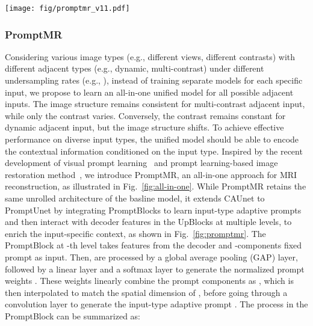 \documentclass[runningheads]{llncs}
\begin{document}
\begin{figure*}[t!]
\centering
\texttt{[image: fig/promptmr\_v11.pdf]}
\caption{Overview of the PromptUnet architecture in PromptMR, featuring a 3-level encoder-decoder design. Each level comprises a DownBlock, UpBlock and PromptBlock. The PromptBlock in the -th level encodes input-specific context into fixed prompt , producing adaptively learned prompt . These prompts, across multiple levels, integrate with decoder features  in the UpBlocks to allow rich hierarchical context learning.}
\label{fig:promptmr}
\end{figure*}


\subsubsection{PromptMR}
Considering various image types (e.g., different views, different contrasts) with different adjacent types (e.g., dynamic, multi-contrast) under different undersampling rates (e.g., ), instead of training separate models for each specific input, we propose to learn an all-in-one unified model for all possible adjacent inputs. 
The image structure remains consistent for multi-contrast adjacent input, while only the contrast varies. Conversely, the contrast remains constant for dynamic adjacent input, but the image structure shifts.
To achieve effective performance on diverse input types, the unified model should be able to encode the contextual information conditioned on the input type. Inspired by the recent development of visual prompt learning~\cite{jia2022visual,khattak2023maple} and prompt learning-based image restoration method~\cite{potlapalli2023promptir}, we introduce PromptMR, an all-in-one approach for MRI reconstruction, as illustrated in Fig.~\ref{fig:all-in-one}. While PromptMR retains the same unrolled architecture of the basline model, it extends CAUnet to PromptUnet by integrating PromptBlocks to learn input-type adaptive prompts and then interact with decoder features in the UpBlocks at multiple levels, to enrich the input-specific context,  as shown in Fig.~\ref{fig:promptmr}. 
The PromptBlock at -th level takes features  from the decoder and -components fixed prompt  as input. Then,  are processed by a global average pooling (GAP) layer, followed by a linear layer and a softmax layer to generate the normalized prompt weights . These weights linearly combine the  prompt components as , which is then interpolated to match the spatial dimension of , before going through a  convolution layer to generate the input-type adaptive prompt . The process in the PromptBlock can be summarized as:
\end{document}

